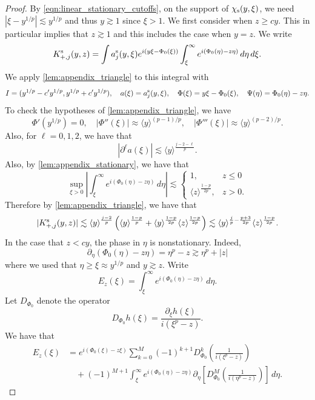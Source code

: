 \documentclass[11pt]{amsart}
\theoremstyle{definition}
\theoremstyle{remark}
\numberwithin{equation}{section}
\newcommand{\ang}[1]{\langle #1 \rangle}
\begin{document}
\begin{proof}
    By \eqref{eqn:linear_stationary_cutoffs}, on the support of $\chi_{\textup{s}}(y,\xi)$, we need $|\xi - y^{1/p}| \lesssim y^{1/p}$ and thus $y \gtrsim 1$ since $\xi > 1$. We first consider when $z \geq cy$. This in particular implies that $z \gtrsim 1$ and this includes the case when $y = z$. We write
    \[K_{+,j}^{\textup{s}}(y,z) = \int a_j^{\textup{s}}(y, \xi) e^{i(y\xi - \Phi_0(\xi))} \int_{\xi}^{\infty}e^{i(\Phi_0(\eta) - z\eta)} \, d\eta  \, d\xi.\]
    We apply \cref{lem:appendix_triangle} to this integral with
    \[I = (y^{1/p} - c'y^{1/p}, y^{1/p} + c'y^{1/p}), \quad a(\xi) = a_j^{\textup{s}}(y,\xi), \quad \Phi(\xi) = y\xi - \Phi_0(\xi), \quad \Psi(\eta) = \Phi_0(\eta) - z\eta.\]
    To check the hypotheses of \cref{lem:appendix_triangle}, we have 
    \[\Phi'(y^{1/p}) = 0, \quad |\Phi''(\xi)| \approx \ang{y}^{(p-1)/p}, \quad  |\Phi'''(\xi)| \approx \ang{y}^{(p - 2)/p}.\]
    Also, for $\ell = 0, 1, 2$, we have that
    \[|\partial^{\ell}a(\xi)| \lesssim \ang{y}^{\frac{j - 2 - \ell}{p}}.\]
    Also, by \cref{lem:appendix_stationary}, we have that
    \[\sup_{\xi > 0}\left|\int_{\xi}^{\infty} e^{i(\Phi_0(\eta) - z\eta)} \, d\eta\right| \lesssim \begin{cases}
        1, & z \leq 0 \\
        \ang{z}^{\frac{1-p}{2p}}, & z > 0.
    \end{cases}\]
    Therefore by \cref{lem:appendix_triangle}, we have that
     \[|K_{+,j}^{\textup{s}}(y,z)| \lesssim \ang{y}^{\frac{j - 2}{p}} \left(\ang{y}^{\frac{1-p}{p}} + \ang{y}^{\frac{1-p}{2p}}\ang{z}^{\frac{1 - p}{2p}} \right) \lesssim \ang{y}^{\frac{j}{p} - \frac{p + 3}{2p}} \ang{z}^{\frac{1 - p}{2p}}. \]
    In the case that $z < cy$, the phase in $\eta$ is nonstationary. Indeed,
    \[\partial_\eta (\Phi_0(\eta) - z\eta) = \eta^{p} - z \gtrsim \eta^{p} + |z|\]
    where we used that $\eta \geq \xi \approx y^{1/p}$ and $y \gtrsim z$. Write
    \[E_z(\xi) = \int_{\xi}^\infty e^{i(\Phi_0(\eta) - z\eta)} \, d\eta.\]
    Let $D_{\Phi_0}$ denote the operator
    \[D_{\Phi_0}h(\xi) = \frac{\partial_\xi h(\xi)}{i(\xi^p - z)}.\]
    We have that 
    \[\begin{aligned}E_z(\xi) & = e^{i(\Phi_0(\xi) - z\xi)}\sum_{k = 0}^{M}(-1)^{k+1}D_{\Phi_0}^k \left(\frac{1}{i(\xi^p - z)}\right) \\ & \quad + (-1)^{M+1}\int_{\xi}^{\infty}e^{i(\Phi_0(\eta) - z\eta)}\partial_\eta\left[D_{\Phi_0}^{M}\left(\frac{1}{i(\eta^p - z)}\right)\right]\,d\eta.\end{aligned}\]

\end{proof}
\end{document}
